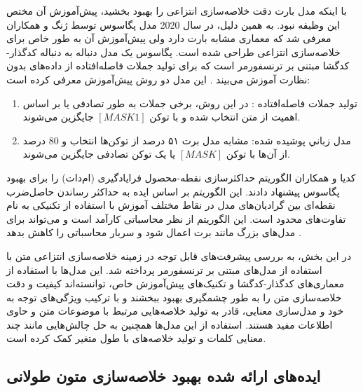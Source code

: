 با اینکه مدل بارت دقت خلاصه‌سازی انتزاعی را بهبود بخشید، پیش‌آموزش آن مختص این وظیفه نبود. به همین دلیل، در سال 2020 مدل پگاسوس توسط ژنگ و همکاران معرفی شد که معماری مشابه بارت دارد ولی پیش‌آموزش آن به طور خاص برای خلاصه‌سازی انتزاعی طراحی شده است. پگاسوس یک مدل دنباله به دنباله کدگذار-کدگشا مبتنی بر ترنسفورمر است که برای تولید جملات فاصله‌افتاده از داده‌های بدون نظارت آموزش می‌بیند \cite{zhang2020pegasus}.
این مدل دو روش پیش‌آموزش معرفی کرده است:
\begin{enumerate}
	\item {
		توليد جملات فاصله‌افتاده : در این روش، برخی جملات به طور تصادفی یا بر اساس اهمیت از متن انتخاب شده و با توکن $[MASK1]$ جایگزین می‌شوند.
	}
	\item{
		 مدل زباني پوشيده شده: مشابه مدل برت ۵۱ درصد از توکن‌ها انتخاب و 80 درصد از آن‌ها با توکن $[MASK]$ یا یک توکن تصادفی جایگزین می‌شوند.
	}
\end{enumerate}

کدیا
و همکاران الگوریتم حداکثرسازی نقطه-محصول فرایادگیری (ام‌دات)
را برای بهبود پگاسوس پیشنهاد دادند. این الگوریتم بر اساس ایده به حداکثر رساندن حاصل‌ضرب نقطه‌ای بین گرادیان‌های مدل در نقاط مختلف آموزش با استفاده از تکنیکی به نام تفاوت‌های محدود
است. این الگوریتم از نظر محاسباتی کارآمد است و می‌تواند برای مدل‌های بزرگ مانند برت اعمال شود و سربار محاسباتی را کاهش بدهد \cite{sherborne2023meta}.




در این بخش، به بررسی پیشرفت‌های قابل توجه در زمینه خلاصه‌سازی انتزاعی متن با استفاده از مدل‌های مبتنی بر ترنسفورمر پرداخته شد. این مدل‌ها با استفاده از معماری‌های کدگذار-کدگشا و تکنیک‌های پیش‌آموزش خاص، توانسته‌اند کیفیت و دقت خلاصه‌سازی متن را به طور چشمگیری بهبود ببخشند و با ترکیب ویژگی‌های توجه به خود و مدل‌سازی معنایی، قادر به تولید خلاصه‌هایی مرتبط با موضوعات متن و حاوی اطلاعات مفید هستند. استفاده از این مدل‌ها همچنین به حل چالش‌هایی مانند چند معنایی کلمات و تولید خلاصه‌های با طول متغیر کمک کرده است.

\subsection{ایده‌های ارائه شده بهبود خلاصه‌سازی متون طولانی }



